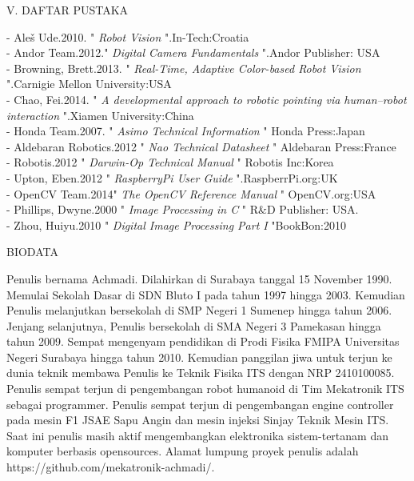 \documentclass[10pt,journal,compsoc]{IEEEtran}
\begin{document}
  \begin{center}
     V. DAFTAR PUSTAKA
  \end{center}
  
  \noindent - Aleš Ude.2010. " \textit{Robot Vision} ".In-Tech:Croatia\\
  - Andor Team.2012." \textit{Digital Camera Fundamentals} ".Andor Publisher: USA \\
  - Browning, Brett.2013. " \textit{Real-Time, Adaptive Color-based Robot Vision} ".Carnigie Mellon University:USA \\
  - Chao, Fei.2014. " \textit{A developmental approach to robotic pointing via human–robot interaction} ".Xiamen University:China \\
  - Honda Team.2007. " \textit{Asimo Technical Information} " Honda Press:Japan\\
  - Aldebaran Robotics.2012 " \textit{Nao Technical Datasheet} " Aldebaran Press:France\\
  - Robotis.2012 " \textit{Darwin-Op Technical Manual} " Robotis Inc:Korea\\
  - Upton, Eben.2012 " \textit{RaspberryPi User Guide} ".RaspberrPi.org:UK\\
  - OpenCV Team.2014" \textit{The OpenCV Reference Manual} " OpenCV.org:USA\\
  - Phillips, Dwyne.2000 " \textit{Image Processing in C} " R\&D Publisher: USA.\\
  - Zhou, Huiyu.2010 " \textit{Digital Image Processing Part I} "BookBon:2010 \\

  \begin{center}
     BIODATA
  \end{center}
  Penulis bernama Achmadi.
  Dilahirkan di Surabaya tanggal 15 November 1990.
  Memulai Sekolah Dasar di SDN Bluto I pada tahun 1997 hingga 2003.
  Kemudian Penulis melanjutkan bersekolah di SMP Negeri 1 Sumenep hingga tahun 2006.
  Jenjang selanjutnya, Penulis bersekolah di SMA Negeri 3 Pamekasan hingga tahun 2009.
  Sempat mengenyam pendidikan di Prodi Fisika FMIPA Universitas Negeri Surabaya hingga tahun 2010.
  Kemudian panggilan jiwa untuk terjun ke dunia teknik membawa Penulis ke Teknik Fisika ITS dengan NRP 2410100085.
  Penulis sempat terjun di pengembangan robot humanoid di Tim Mekatronik ITS sebagai programmer.
  Penulis sempat terjun di pengembangan engine controller pada mesin F1 JSAE Sapu Angin dan mesin injeksi Sinjay Teknik Mesin ITS.
  Saat ini penulis masih aktif mengembangkan elektronika sistem-tertanam dan komputer berbasis opensources.
  Alamat lumpung proyek penulis adalah https://github.com/mekatronik-achmadi/.

  
\end{document}
